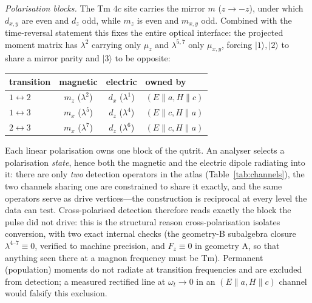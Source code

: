 \documentclass[aps,prb,twocolumn,superscriptaddress,longbibliography]{revtex4-2}
\newcommand{\ket}[1]{|#1\rangle}
\begin{document}
\emph{Polarisation blocks.}  The Tm $4c$ site carries the mirror $m$
($z\to-z$), under which $d_{x,y}$ are even and $d_z$ odd, while $m_z$
is even and $m_{x,y}$ odd.  Combined with the time-reversal statement
this fixes the entire optical interface: the projected moment matrix
has $\lambda^2$ carrying only $\mu_z$ and $\lambda^{5,7}$ only
$\mu_{x,y}$, forcing $\ket1,\ket2$ to share a mirror parity and
$\ket3$ to be opposite:
\begin{center}\small
\renewcommand{\arraystretch}{1.25}
\begin{tabular}{lccl}
\hline
transition & magnetic & electric & owned by\\
\hline
$1\!\leftrightarrow\!2$ & $m_z$ ($\lambda^2$) & $d_{x}$ ($\lambda^1$) &
  $(E\!\parallel\!a,H\!\parallel\!c)$\\
$1\!\leftrightarrow\!3$ & $m_{x}$ ($\lambda^5$) & $d_z$ ($\lambda^4$) &
  $(E\!\parallel\!c,H\!\parallel\!a)$\\
$2\!\leftrightarrow\!3$ & $m_{x}$ ($\lambda^7$) & $d_z$ ($\lambda^6$) &
  $(E\!\parallel\!c,H\!\parallel\!a)$\\
\hline
\end{tabular}
\end{center}
Each linear polarisation owns one block of the qutrit.  An analyser
selects a polarisation \emph{state}, hence both the magnetic and the
electric dipole radiating into it: there are only \emph{two}
detection operators in the atlas (Table~\ref{tab:channels}), the two
channels sharing one are constrained to share it exactly, and the
same operators serve as drive vertices---the construction is
reciprocal at every level the data can test.  Cross-polarised
detection therefore reads exactly the block the pulse did not drive:
this is the structural reason cross-polarisation isolates conversion,
with two exact internal checks (the geometry-B subalgebra closure
$\lambda^{4\text{--}7}\equiv0$, verified to machine precision, and
$F_z\equiv0$ in geometry A, so that anything seen there at a magnon
frequency must be Tm).  Permanent (population) moments do not radiate
at transition frequencies and are excluded from detection; a measured
rectified line at $\omega_t\to0$ in an
$(E\!\parallel\!a,H\!\parallel\!c)$ channel would falsify this
exclusion.
\end{document}

